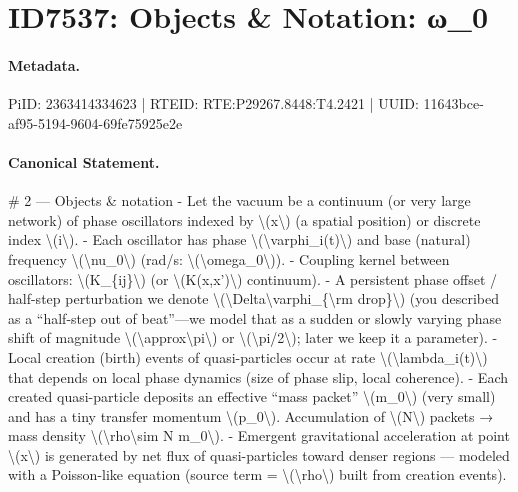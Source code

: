 \section*{ID7537: Objects \& Notation: ω\_0}
\paragraph{Metadata.}
PiID: 2363414334623 | RTEID: RTE:P29267.8448:T4.2421 | UUID: 11643bce-af95-5194-9604-69fe75925e2e

\paragraph{Canonical Statement.}
\# 2 — Objects \& notation - Let the vacuum be a continuum (or very large network) of phase oscillators indexed by \textbackslash{}(x\textbackslash{}) (a spatial position) or discrete index \textbackslash{}(i\textbackslash{}). - Each oscillator has phase \textbackslash{}(\textbackslash{}varphi\_i(t)\textbackslash{}) and base (natural) frequency \textbackslash{}(\textbackslash{}nu\_0\textbackslash{}) (rad/s: \textbackslash{}(\textbackslash{}omega\_0\textbackslash{})). - Coupling kernel between oscillators: \textbackslash{}(K\_\{ij\}\textbackslash{}) (or \textbackslash{}(K(x,x')\textbackslash{}) continuum). - A persistent phase offset / half-step perturbation we denote \textbackslash{}(\textbackslash{}Delta\textbackslash{}varphi\_\{\textbackslash{}rm drop\}\textbackslash{}) (you described as a “half-step out of beat”—we model that as a sudden or slowly varying phase shift of magnitude \textbackslash{}(\textbackslash{}approx\textbackslash{}pi\textbackslash{}) or \textbackslash{}(\textbackslash{}pi/2\textbackslash{}); later we keep it a parameter). - Local creation (birth) events of quasi-particles occur at rate \textbackslash{}(\textbackslash{}lambda\_i(t)\textbackslash{}) that depends on local phase dynamics (size of phase slip, local coherence). - Each created quasi-particle deposits an effective “mass packet” \textbackslash{}(m\_0\textbackslash{}) (very small) and has a tiny transfer momentum \textbackslash{}(p\_0\textbackslash{}). Accumulation of \textbackslash{}(N\textbackslash{}) packets → mass density \textbackslash{}(\textbackslash{}rho\textbackslash{}sim N m\_0\textbackslash{}). - Emergent gravitational acceleration at point \textbackslash{}(x\textbackslash{}) is generated by net flux of quasi-particles toward denser regions — modeled with a Poisson-like equation (source term = \textbackslash{}(\textbackslash{}rho\textbackslash{}) built from creation events).

